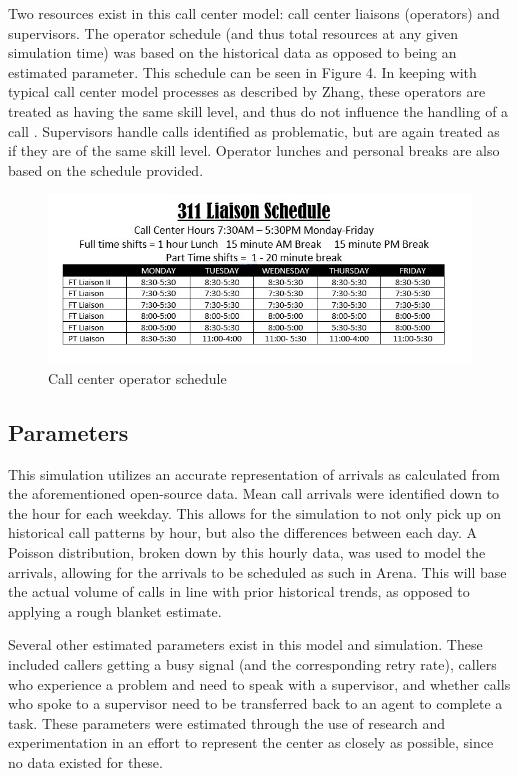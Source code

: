 \documentclass[12pt,twocolumn]{article}
\begin{document}
\par

Two resources exist in this call center model:  call center liaisons (operators) and supervisors.  The operator schedule (and thus total resources at any given simulation time) was based on the historical data as opposed to being an estimated parameter.  This schedule can be seen in Figure 4.  In keeping with typical call center model processes as described by Zhang, these operators are treated as having the same skill level, and thus do not influence the handling of a call \cite{zhang}.  Supervisors handle calls identified as problematic, but are again treated as if they are of the same skill level.  Operator lunches and personal breaks are also based on the schedule provided.

	\begin{figure}[h]
		\includegraphics[scale=.3]{schedule2.jpg}
		\caption{Call center operator schedule}
	\end{figure}
	
	\subsection{Parameters}
	
	
	This simulation utilizes an accurate representation of arrivals as calculated from the aforementioned open-source data.  Mean call arrivals were identified down to the hour for each weekday.  This allows for the simulation to not only pick up on historical call patterns by hour, but also the differences between each day.  A Poisson distribution, broken down by this hourly data, was used to model the arrivals, allowing for the arrivals to be scheduled as such in Arena.  This will base the actual volume of calls in line with prior historical trends, as opposed to applying a rough blanket estimate.
	
	\par
	
	Several other estimated parameters exist in this model and simulation.  These included callers getting a busy signal (and the corresponding retry rate), callers who experience a problem and need to speak with a supervisor, and whether calls who spoke to a supervisor need to be transferred back to an agent to complete a task.  These parameters were estimated through the use of research and experimentation in an effort to represent the center as closely as possible, since no data existed for these.
	
\end{document}
